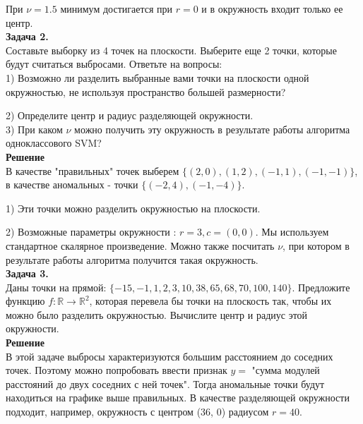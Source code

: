 При $\nu = 1.5$ минимум достигается при $r = 0$ и в окружность входит только ее центр. \\

\textbf{Задача 2.} \\

Составьте выборку из 4 точек на плоскости. Выберите еще 2 точки, которые будут считаться выбросами. Ответьте на вопросы: \\

1) Возможно ли разделить выбранные вами точки на плоскости одной окружностью, не используя пространство большей размерности?

2) Определите центр и радиус разделяющей окружности. \\

3) При каком $\nu$ можно получить эту окружность в результате работы алгоритма одноклассового SVM?\\

\textbf{Решение} \\

В качестве "правильных" точек выберем $\{(2,0), (1,2), (-1,1), (-1,-1)\}$, в качестве аномальных - точки $\{(-2,4), (-1,-4)\}$.

1) Эти точки можно разделить окружностью на плоскости.

2) Возможные параметры окружности : $r = 3, c = (0,0)$. Мы используем стандартное скалярное произведение. Можно также посчитать $\nu$, при котором в результате работы алгоритма получится такая окружность. \\ 

\textbf{Задача 3.} \\

Даны точки на прямой: $\{-15, -1, 1, 2, 3, 10, 38, 65, 68, 70, 100, 140\}$. Предложите функцию $f: \mathbb{R} \rightarrow \mathbb{R}^2$, которая перевела бы точки на плоскость так, чтобы их можно было разделить окружностью. Вычислите центр и радиус этой окружности.\\

\textbf{Решение} \\

В этой задаче выбросы характеризуются большим расстоянием до соседних точек. Поэтому можно попробовать ввести признак $y = $ "сумма модулей расстояний до двух соседних с ней точек". Тогда аномальные точки будут находиться на графике выше правильных. В качестве разделяющей окружности подходит, например, окружность с центром (36, 0) радиусом $r = 40$.

